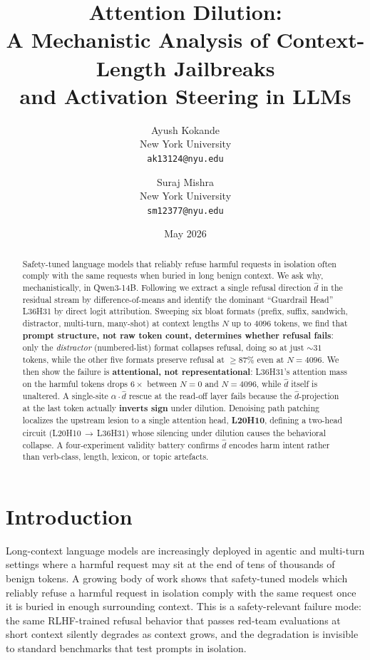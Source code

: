 \documentclass[10pt,twocolumn]{article}
\title{Attention Dilution:\\
       A Mechanistic Analysis of Context-Length Jailbreaks\\
       and Activation Steering in LLMs}
\author{
  Ayush Kokande \\
  New York University \\
  \texttt{ak13124@nyu.edu}
  \and
  Suraj Mishra \\
  New York University \\
  \texttt{sm12377@nyu.edu}
}
\date{May 2026}
\newcommand{\dhat}{\hat{d}}
\newcommand{\Ncontext}{N}
\newcommand{\model}{Qwen3-14B}
\theoremstyle{definition}
\begin{document}
\maketitle

\begin{abstract}
Safety-tuned language models that reliably refuse harmful requests in
isolation often comply with the same requests when buried in long benign
context. We ask why, mechanistically, in \model{}. Following
\citet{arditi2024refusal} we extract a single refusal direction $\dhat$ in
the residual stream by difference-of-means and identify the dominant
``Guardrail Head'' L36H31 by direct logit attribution. Sweeping six bloat
formats (prefix, suffix, sandwich, distractor, multi-turn, many-shot) at
context lengths $\Ncontext$ up to $4096$ tokens, we find that
\textbf{prompt structure, not raw token count, determines whether refusal
fails}: only the \emph{distractor} (numbered-list) format collapses
refusal, doing so at just ${\sim}31$ tokens, while the other five formats
preserve refusal at ${\geq}87\%$ even at $\Ncontext{=}4096$. We then show
the failure is \textbf{attentional, not representational}: L36H31's
attention mass on the harmful tokens drops $6\times$ between $\Ncontext{=}0$
and $\Ncontext{=}4096$, while $\dhat$ itself is unaltered. A single-site
$\alpha\!\cdot\!\dhat$ rescue at the read-off layer fails because the
$\dhat$-projection at the last token actually \textbf{inverts sign} under
dilution. Denoising path patching localizes the upstream lesion to a
single attention head, \textbf{L20H10}, defining a two-head circuit
(L20H10\,$\to$\,L36H31) whose silencing under dilution causes the
behavioral collapse. A four-experiment validity battery confirms $\dhat$
encodes harm intent rather than verb-class, length, lexicon, or topic
artefacts.
\end{abstract}

\section{Introduction}
\label{sec:intro}

Long-context language models are increasingly deployed in agentic and
multi-turn settings where a harmful request may sit at the end of tens of
thousands of benign tokens. A growing body of work
\citep{anil2024manyshot, liu2024lostmiddle} shows that safety-tuned
models which reliably refuse a harmful request in isolation comply with
the same request once it is buried in enough surrounding context. This is
a safety-relevant failure mode: the same RLHF-trained refusal behavior
that passes red-team evaluations at short context silently degrades as
context grows, and the degradation is invisible to standard benchmarks
that test prompts in isolation.
\end{document}
